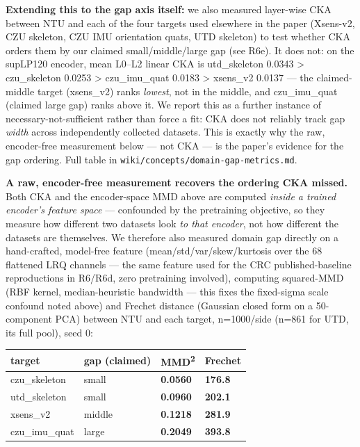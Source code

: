 \textbf{Extending this to the gap axis itself:} we also measured layer-wise CKA between NTU and each of the four targets used elsewhere in the paper (Xsens-v2, CZU skeleton, CZU IMU orientation quats, UTD skeleton) to test whether CKA orders them by our claimed small/middle/large gap (see R6e). It does not: on the supLP120 encoder, mean L0--L2 linear CKA is utd\_skeleton 0.0343 > czu\_skeleton 0.0253 > czu\_imu\_quat 0.0183 > xsens\_v2 0.0137 --- the claimed-middle target (xsens\_v2) ranks \textit{lowest}, not in the middle, and czu\_imu\_quat (claimed large gap) ranks above it. We report this as a further instance of necessary-not-sufficient rather than force a fit: CKA does not reliably track gap \textit{width} across independently collected datasets. This is exactly why the raw, encoder-free measurement below --- not CKA --- is the paper's evidence for the gap ordering. Full table in \texttt{wiki/concepts/domain-gap-metrics.md}.

\textbf{A raw, encoder-free measurement recovers the ordering CKA missed.} Both CKA and the encoder-space MMD above are computed \textit{inside a trained encoder's feature space} --- confounded by the pretraining objective, so they measure how different two datasets look \textit{to that encoder}, not how different the datasets are themselves. We therefore also measured domain gap directly on a hand-crafted, model-free feature (mean/std/var/skew/kurtosis over the 68 flattened LRQ channels --- the same feature used for the CRC published-baseline reproductions in R6/R6d, zero pretraining involved), computing squared-MMD (RBF kernel, median-heuristic bandwidth --- this fixes the fixed-sigma scale confound noted above) and Frechet distance (Gaussian closed form on a 50-component PCA) between NTU and each target, n=1000/side (n=861 for UTD, its full pool), seed 0:

\begin{center}
\small
\begin{tabular}{llll}
\toprule
target & gap (claimed) & MMD\textsuperscript{2} & Frechet \\
\midrule
czu\_skeleton & small & \textbf{0.0560} & \textbf{176.8} \\
utd\_skeleton & small & \textbf{0.0960} & \textbf{202.1} \\
xsens\_v2 & middle & \textbf{0.1218} & \textbf{281.9} \\
czu\_imu\_quat & large & \textbf{0.2049} & \textbf{393.8} \\
\bottomrule
\end{tabular}
\end{center}

